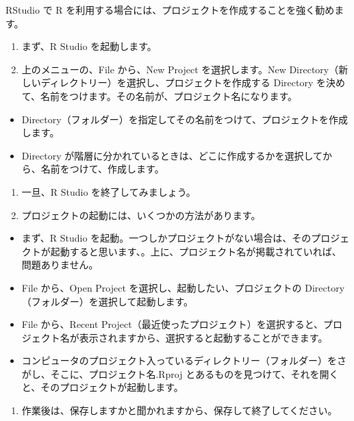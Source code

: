\documentclass[
  xelatex, ja=standard]{bxjsbook}
\providecommand{\tightlist}{%
  \setlength{\itemsep}{0pt}\setlength{\parskip}{0pt}}
\theoremstyle{definition}
\theoremstyle{definition}
\theoremstyle{definition}
\theoremstyle{definition}
\theoremstyle{remark}
\begin{document}
RStudio で R を利用する場合には、プロジェクトを作成することを強く勧めます。

\begin{enumerate}
\def\labelenumi{\arabic{enumi}.}
\item
  まず、R Studio を起動します。
\item
  上のメニューの、File から、New Project を選択します。New Directory（新しいディレクトリー）を選択し、プロジェクトを作成する Directory を決めて、名前をつけます。その名前が、プロジェクト名になります。
\end{enumerate}

\begin{itemize}
\tightlist
\item
  Directory（フォルダー）を指定してその名前をつけて、プロジェクトを作成します。
\item
  Directory が階層に分かれているときは、どこに作成するかを選択してから、名前をつけて、作成します。
\end{itemize}

\begin{enumerate}
\def\labelenumi{\arabic{enumi}.}
\setcounter{enumi}{2}
\item
  一旦、R Studio を終了してみましょう。
\item
  プロジェクトの起動には、いくつかの方法があります。
\end{enumerate}

\begin{itemize}
\tightlist
\item
  まず、R Studio を起動。一つしかプロジェクトがない場合は、そのプロジェクトが起動すると思います、。上に、プロジェクト名が掲載されていれば、問題ありません。
\item
  File から、Open Project を選択し、起動したい、プロジェクトの Directory（フォルダー）を選択して起動します。
\item
  File から、Recent Project（最近使ったプロジェクト）を選択すると、プロジェクト名が表示されますから、選択すると起動することができます。
\item
  コンピュータのプロジェクト入っているディレクトリー（フォルダー）をさがし、そこに、プロジェクト名.Rproj とあるものを見つけて、それを開くと、そのプロジェクトが起動します。
\end{itemize}

\begin{enumerate}
\def\labelenumi{\arabic{enumi}.}
\setcounter{enumi}{4}
\tightlist
\item
  作業後は、保存しますかと聞かれますから、保存して終了してください。
\end{enumerate}
\end{document}
